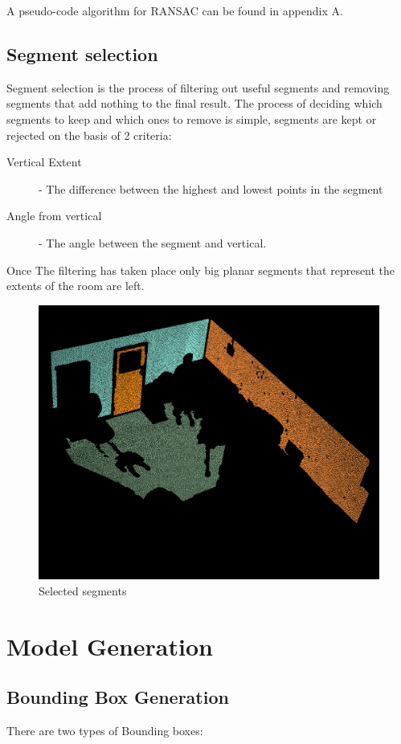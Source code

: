 				
				A pseudo-code algorithm for RANSAC can be found in appendix A.
		\subsection{Segment selection}
			Segment selection is the process of filtering out useful segments and removing segments that add nothing to the final result. The process of deciding which segments to keep and which ones to remove is simple, segments are kept or rejected on the basis of 2 criteria:
			
			\begin{description}
				\item[Vertical Extent] - The  difference between the highest and lowest points in the segment
				\item[Angle from vertical] - The angle between the segment and vertical.
			\end{description}
			
			Once The filtering has taken place only big planar segments that represent the extents of the room are left.
			
			\begin{figure}[H]
				\centering
				\includegraphics[width=0.7\linewidth]{"Includes/images/Selected segments"}
				\caption{Selected segments}
				\label{fig:Selectedsegments}
			\end{figure}
			
		
\newpage
\section{Model Generation}
		\subsection{Bounding Box Generation}
			There are two types of Bounding boxes:
			
